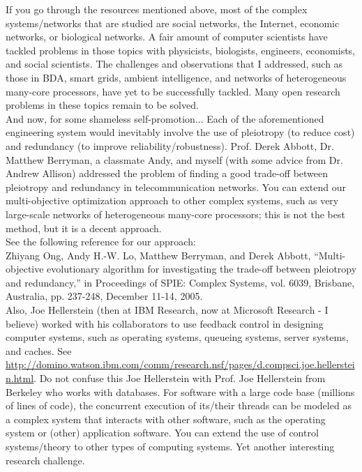 If you go through the resources mentioned above, most of the complex systems/networks that are studied are social networks, the Internet, economic networks, or biological networks. A fair amount of computer scientists have tackled problems in those topics with physicists, biologists, engineers, economists, and social scientists. The challenges and observations that I addressed, such as those in BDA, smart grids, ambient intelligence, and networks of heterogeneous many-core processors, have yet to be successfully tackled. Many open research problems in these topics remain to be solved. \\

And now, for some shameless self-promotion... Each of the aforementioned engineering system would inevitably involve the use of pleiotropy (to reduce cost) and redundancy (to improve reliability/robustness). Prof. Derek Abbott, Dr. Matthew Berryman, a classmate Andy, and myself (with some advice from Dr. Andrew Allison) addressed the problem of finding a good trade-off between pleiotropy and redundancy in telecommunication networks. You can extend our multi-objective optimization approach to other complex systems, such as very large-scale networks of heterogeneous many-core processors; this is not the best method, but it is a decent approach. \\

See the following reference for our approach: \\
Zhiyang Ong, Andy H.-W. Lo, Matthew Berryman, and Derek Abbott, ``Multi-objective evolutionary algorithm for investigating the trade-off between pleiotropy and redundancy,'' in Proceedings of SPIE: Complex Systems, vol. 6039, Brisbane, Australia, pp. 237-248, December 11-14, 2005. \\


Also, Joe Hellerstein (then at IBM Research, now at Microsoft Research - I believe) worked with his collaborators to use feedback control in designing computer systems, such as operating systems, queueing systems, server systems, and caches. See \url{http://domino.watson.ibm.com/comm/research.nsf/pages/d.compsci.joe.hellerstein.html}. Do not confuse this Joe Hellerstein with Prof. Joe Hellerstein from Berkeley who works with databases. For software with a large code base (millions of lines of code), the concurrent execution of its/their threads can be modeled as a complex system that interacts with other software, such as the operating system or (other) application software. You can extend the use of control systems/theory to other types of computing systems. Yet another interesting research challenge. \\

